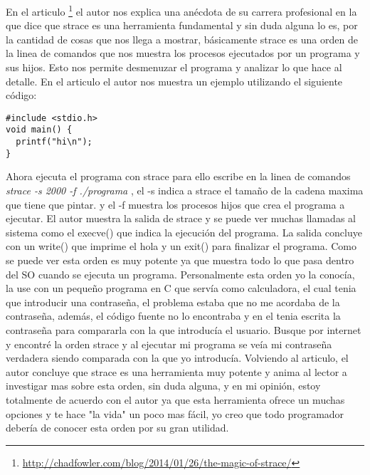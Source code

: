En el articulo \footnote{\url{http://chadfowler.com/blog/2014/01/26/the-magic-of-strace/}} el autor nos explica una anécdota de su carrera profesional en la que dice que strace es una herramienta fundamental y sin duda alguna lo es, por la cantidad de cosas que nos llega a mostrar, básicamente strace es una orden de la linea de comandos que nos muestra los procesos ejecutados por un programa y sus hijos. Esto nos permite desmenuzar el programa y analizar lo que hace al detalle. En el articulo el autor nos muestra un ejemplo utilizando el siguiente código:
\begin{verbatim}
#include <stdio.h>
void main() {
  printf("hi\n");
}
\end{verbatim}
Ahora ejecuta el programa con strace para ello escribe en la linea de comandos \textit{strace -s 2000 -f ./programa}
, el -s indica a strace el tamaño de la cadena maxima que tiene que pintar. y el -f muestra los procesos hijos que crea el programa a ejecutar.
El autor muestra la salida de strace y se puede ver muchas llamadas al sistema como el execve() que indica la ejecución del programa. La salida concluye con un write() que imprime el hola y un exit() para finalizar el programa.
Como se puede ver esta orden es muy potente ya que muestra todo lo que pasa dentro del SO cuando se ejecuta un programa. Personalmente esta orden yo la conocía, la use con un pequeño programa en C que servía como calculadora, el cual tenia que introducir una contraseña, el problema estaba que no me acordaba de la contraseña, además, el código fuente no lo encontraba y en el tenia escrita la contraseña para compararla con la que introducía el usuario. Busque por internet y encontré la orden strace y al ejecutar mi programa se veía mi contraseña verdadera siendo comparada con la que yo introducía.
Volviendo al articulo, el autor concluye que strace es una herramienta muy potente y anima al lector a investigar mas sobre esta orden, sin duda alguna, y en mi opinión, estoy totalmente de acuerdo con el autor ya que esta herramienta ofrece un muchas opciones y te hace "la vida" un poco mas fácil, yo creo que todo programador debería de conocer esta orden por su gran utilidad.
